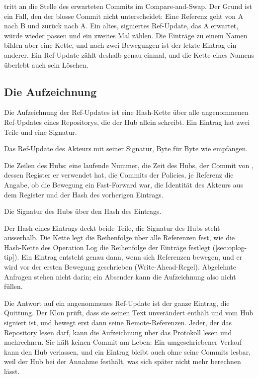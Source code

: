 tritt an die Stelle des erwarteten Commits im Compare-and-Swap.
Der Grund ist ein Fall, den der blosse Commit nicht unterscheidet: Eine Referenz geht von A nach
B und zurück nach A.
Ein altes, signiertes Ref-Update, das A erwartet, würde wieder passen und ein zweites Mal zählen.
Die Einträge zu einem Namen bilden aber eine Kette, und nach zwei Bewegungen ist der letzte
Eintrag ein anderer.
Ein Ref-Update zählt deshalb genau einmal, und die Kette eines Namens überlebt auch sein Löschen.

\subsection{Die Aufzeichnung}

Die Aufzeichnung der Ref-Updates ist eine Hash-Kette über alle angenommenen Ref-Updates eines
Repositorys, die der Hub allein schreibt.
Ein Eintrag hat zwei Teile und eine Signatur.

\startitemize[n]
\item Das Ref-Update des Akteurs mit seiner Signatur, Byte für Byte wie empfangen.
\item Die Zeilen des Hubs: eine laufende Nummer, die Zeit des Hubs, der Commit von ,
dessen Register er verwendet hat, die Commits der Policies, je Referenz die Angabe, ob die
Bewegung ein Fast-Forward war, die Identität des Akteurs aus dem Register und der Hash des
vorherigen Eintrags.
\item Die Signatur des Hubs über den Hash des Eintrags.
\stopitemize

Der Hash eines Eintrags deckt beide Teile, die Signatur des Hubs steht ausserhalb.
Die Kette legt die Reihenfolge über alle Referenzen fest, wie die Hash-Kette des Operation Log
die Reihenfolge der Einträge festlegt ([sec:oplog-tip]).
Ein Eintrag entsteht genau dann, wenn sich Referenzen bewegen, und er wird vor der ersten
Bewegung geschrieben (Write-Ahead-Regel).
Abgelehnte Anfragen stehen nicht darin; ein Absender kann die Aufzeichnung also nicht füllen.

Die Antwort auf ein angenommenes Ref-Update ist der ganze Eintrag, die Quittung.
Der Klon prüft, dass sie seinen Text unverändert enthält und vom Hub signiert ist,
und bewegt erst dann seine Remote-Referenzen.
Jeder, der das Repository lesen darf, kann die Aufzeichnung über das Protokoll lesen und
nachrechnen.
Sie hält keinen Commit am Leben: Ein umgeschriebener Verlauf kann den Hub verlassen, und ein
Eintrag bleibt auch ohne seine Commits lesbar, weil der Hub bei der Annahme festhält, was sich
später nicht mehr berechnen lässt.

